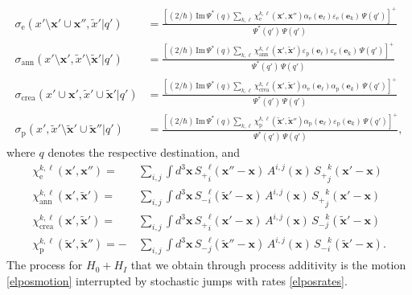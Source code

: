 \documentclass[12pt]{article}
\newcommand{\1}{\mathbf{1}} %
\renewcommand{\Im}{\mathrm{Im}} %
\newcommand{\Dindex}{i} %
\newcommand{\Dindextwo}{j} %
\newcommand{\Dindexthree}{k}
\newcommand{\Dindexfour}{\ell}
\newcommand{\ve}{{\boldsymbol e}}
\newcommand{\vx}{{\boldsymbol x}} %
\newcommand{\pvx}{{\widetilde{\vx}}}
\newcommand{\px}{{\widetilde{x}}}
\newcommand{\inter}{{I}} %
\newcommand{\el}{\mathrm{e}} %
\newcommand{\pos}{\mathrm{p}} %
\newcommand{\crea}{{\mathrm{crea}}} %
\newcommand{\ann}{{\mathrm{ann}}} %
\begin{document}
\begin{subequations}\label{elposrates}
\begin{align}
   \sigma_\el (x'\setminus \vx' \cup \vx'',\px'|q') &= \frac{[(2/\hbar)
   \, \Im \, \Psi^*(q) \sum_{\Dindexthree,\Dindexfour}
   \chi_\el^{\Dindexthree, \Dindexfour} (\vx',\vx'')
   \alpha_\el(\ve_\Dindexfour) \varepsilon_\el(\ve_\Dindexthree)\,
   \Psi(q')]^+}{\Psi^*(q') \, \Psi(q')} \\
   \sigma_\ann (x'\setminus \vx',\px'\setminus \pvx'|q') &=
   \frac{[(2/\hbar) \, \Im \, \Psi^*(q) \sum_{\Dindexthree,\Dindexfour}
   \chi_\ann^{\Dindexthree, \Dindexfour} (\vx',\pvx')
   \varepsilon_\pos(\ve_\Dindexfour) \varepsilon_\el(\ve_\Dindexthree)\,
   \Psi(q')]^+}{\Psi^*(q') \, \Psi(q')} \\
   \sigma_\crea (x'\cup \vx',\px' \cup \pvx'|q') &= \frac{[(2/\hbar) \,
   \Im \, \Psi^*(q) \sum_{\Dindexthree,\Dindexfour}
   \chi_\crea^{\Dindexthree, \Dindexfour} (\vx',\pvx')
   \alpha_\el(\ve_\Dindexfour) \alpha_\pos(\ve_\Dindexthree)\,
   \Psi(q')]^+}{\Psi^*(q') \, \Psi(q')} \\
   \sigma_\pos (x',\px'\setminus \pvx' \cup \pvx''|q') &=
   \frac{[(2/\hbar) \, \Im \, \Psi^*(q) \sum_{\Dindexthree,\Dindexfour}
   \chi_\pos^{\Dindexthree, \Dindexfour} (\pvx',\pvx'')
   \alpha_\pos(\ve_\Dindexfour) \varepsilon_\pos(\ve_\Dindexthree)\,
   \Psi(q')]^+}{\Psi^*(q') \, \Psi(q')},
\end{align}
\end{subequations}
where $q$ denotes the respective destination, and
\begin{subequations}
\begin{align}
   \chi_\el^{\Dindexthree, \Dindexfour}(\vx',\vx'') =\quad &
   \sum\limits_{\Dindex,\Dindextwo} \int d^3\vx \,
   {S_+}^\Dindexfour_\Dindex (\vx''-\vx) \, A^{\Dindex,\Dindextwo}
   (\vx) \, {S_+}^\Dindexthree_\Dindextwo (\vx'-\vx) \\
   \chi_\ann^{\Dindexthree, \Dindexfour} (\vx',\pvx') =\quad &
   \sum\limits_{\Dindex,\Dindextwo} \int d^3\vx \,
   {S_-}^\Dindexfour_\Dindex (\pvx'-\vx) \, A^{\Dindex,\Dindextwo}
   (\vx) \, {S_+}^\Dindexthree_\Dindextwo (\vx'-\vx) \\
   \chi_\crea^{\Dindexthree, \Dindexfour} (\vx',\pvx') =\quad
   &\sum\limits_{\Dindex,\Dindextwo} \int d^3\vx \,
   {S_+}^\Dindexfour_\Dindex (\vx'-\vx) \, A^{\Dindex,\Dindextwo} (\vx)
   \, {S_-}^\Dindexthree_\Dindextwo (\pvx'-\vx) \\
   \chi_\pos^{\Dindexthree, \Dindexfour} (\pvx',\pvx'') =
   -&\sum\limits_{\Dindex,\Dindextwo} \int d^3\vx \,
   {S_-}^\Dindexfour_\Dindextwo (\pvx''-\vx) \, A^{\Dindex,\Dindextwo}
   (\vx) \, {S_-}^\Dindexthree_\Dindex (\pvx'-\vx).
\end{align}
\end{subequations}
The process for $H_0 + H_\inter$ that we obtain through process
additivity is the motion \eqref{elposmotion} interrupted by stochastic
jumps with rates \eqref{elposrates}.
\end{document}
